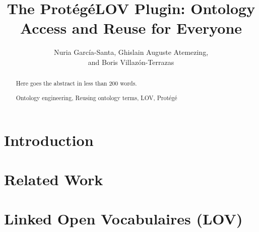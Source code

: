 \documentclass[runningheads,a4paper]{llncs}
\newcommand{\keywords}[1]{\par\addvspace\baselineskip
\noindent\keywordname\enspace\ignorespaces#1}
\begin{document}

\title{The Prot{\'e}g{\'e}LOV Plugin: Ontology Access and Reuse for Everyone }


\author{Nuria Garc\'ia-Santa, Ghislain Auguste Atemezing,\\ and Boris Villaz{\'o}n-Terrazas}


\maketitle


\begin{abstract}
Here goes the abstract in less than 200 words.

\keywords{Ontology engineering, Reusing ontology terms, LOV, Prot{\'e}g{\'e}} 
\end{abstract}


\section{Introduction}\label{sec:introduction}




\section{Related Work}\label{sec:soa}




\section{Linked Open Vocabulaires (LOV)}\label{sec:lov}

\end{document}
